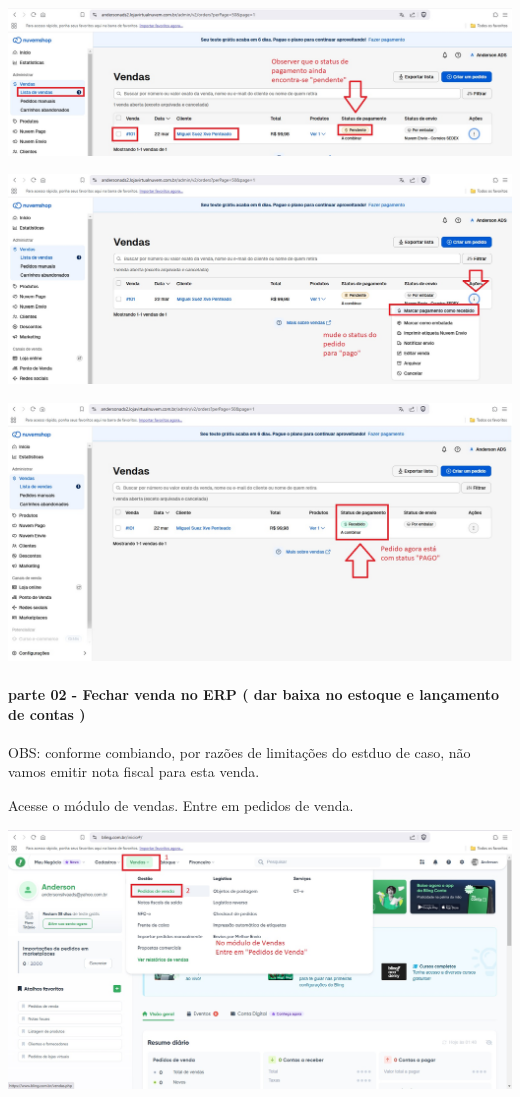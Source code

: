 \documentclass[
]{book}
\begin{document}
\includegraphics{images/np1/106-loja_virtual_lberar_venda2.jpg}

\includegraphics{images/np1/107-loja_virtual_lberar_venda3.jpg}

\includegraphics{images/np1/108-loja_virtual_liberar_venda4.jpg}

\paragraph{parte 02 - Fechar venda no ERP ( dar baixa no estoque e lançamento de contas )}\label{parte-02---fechar-venda-no-erp-dar-baixa-no-estoque-e-lanuxe7amento-de-contas}

OBS: conforme combiando, por razões de limitações do estduo de caso, não vamos emitir nota fiscal para esta venda.

Acesse o módulo de vendas. Entre em pedidos de venda.

\includegraphics{images/np1/109-ERP_liberar_venda1.jpg}
\end{document}
